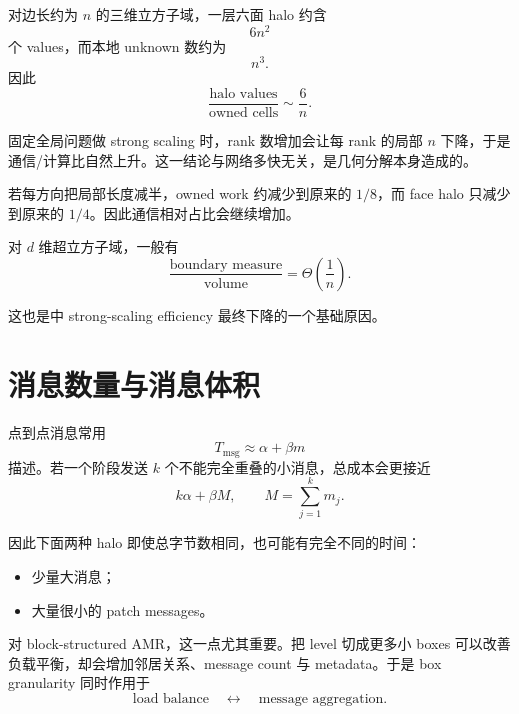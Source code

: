 对边长约为 $n$ 的三维立方子域，一层六面 halo 约含
\begin{equation}
6n^2
\end{equation}
个 values，而本地 unknown 数约为
\begin{equation}
n^3.
\end{equation}
因此
\begin{equation}
\boxed{
\frac{\text{halo values}}
{\text{owned cells}}
\sim
\frac{6}{n}.
}
\label{eq:mpi-surface-volume-ratio}
\end{equation}

固定全局问题做 strong scaling 时，rank 数增加会让每 rank 的局部 $n$ 下降，于是通信/计算比自然上升。这一结论与网络多快无关，是几何分解本身造成的。

若每方向把局部长度减半，owned work 约减少到原来的 $1/8$，而 face halo 只减少到原来的 $1/4$。因此通信相对占比会继续增加。

对 $d$ 维超立方子域，一般有
\begin{equation}
\frac{\text{boundary measure}}
{\text{volume}}
=
\Theta\left(\frac1n\right).
\end{equation}

这也是中 strong-scaling efficiency 最终下降的一个基础原因。

\section{消息数量与消息体积}

点到点消息常用
\begin{equation}
T_{\mathrm{msg}}
\approx
\alpha+\beta m
\end{equation}
描述。若一个阶段发送 $k$ 个不能完全重叠的小消息，总成本会更接近
\begin{equation}
k\alpha+\beta M,
\qquad
M=\sum_{j=1}^k m_j.
\end{equation}

因此下面两种 halo 即使总字节数相同，也可能有完全不同的时间：
\begin{itemize}
\item 少量大消息；
\item 大量很小的 patch messages。
\end{itemize}

对 block-structured AMR，这一点尤其重要。把 level 切成更多小 boxes 可以改善负载平衡，却会增加邻居关系、message count 与 metadata。于是 box granularity 同时作用于
\begin{equation}
\boxed{
\text{load balance}
\quad\leftrightarrow\quad
\text{message aggregation}.
}
\end{equation}

